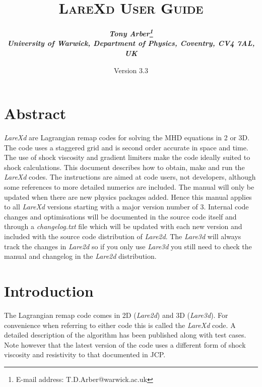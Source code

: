 \documentclass[11pt]{article}
\begin{document}
\title{
\bfseries\scshape LareXd User Guide}
\author{\bfseries\itshape Tony Arber\thanks{E-mail address: T.D.Arber@warwick.ac.uk}\\
University of Warwick, Department of Physics, Coventry, CV4 7AL, UK}
\date{Version 3.3}
\maketitle

\thispagestyle{empty}

\section*{Abstract}
{\it LareXd} are Lagrangian remap codes for solving the MHD equations in 2 or 3D. The code uses a staggered grid 
and is second order accurate in space and time. The use of shock viscosity and gradient limiters make the code 
ideally suited to shock calculations. This document describes how to obtain, make and run the {\it LareXd}  
codes. The instructions are aimed at code users, not developers, although some references to more detailed 
numerics are included. The manual will only be
updated when there are new physics packages added. Hence this manual applies to all {\it LareXd} versions 
starting with a major version number of 3. Internal code changes and optimisations will be documented in the 
source code itself and through a {\it changelog.txt} file which will be updated with each new version and 
included with the source code distribution of {\it Lare2d}. The {\it Lare3d} will always track the changes 
in {\it Lare2d} so if you only use {\it Lare3d} you still need to check the manual and changelog in the 
{\it Lare2d} distribution.


\section{Introduction}
The Lagrangian remap code comes in 2D ({\it Lare2d}) and 3D ({\it Lare3d}). For convenience when referring 
to either code this is called the {\it LareXd} code. A detailed description of the algorithm has been 
published \cite{jcp} along with test cases. Note however that the latest version of the code uses a 
different form of shock viscosity and resistivity to that documented in JCP. 
\end{document}
